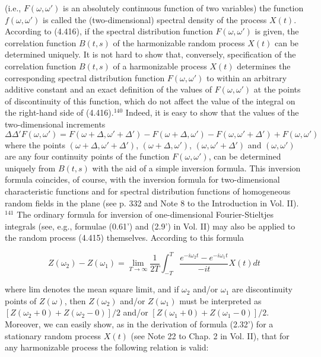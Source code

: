 \documentclass{article}
\begin{document}
(i.e., $F(\omega,\omega')$ is an absolutely continuous function of two variables) the function $f(\omega,\omega')$ is called the (two-dimensional) spectral density of the process $X(t)$. According to (4.416), if the spectral distribution function $F(\omega,\omega')$ is given, the correlation function $B(t,s)$ of the harmonizable random process $X(t)$ can be determined uniquely. It is not hard to show that, conversely, specification of the correlation function $B(t,s)$ of a harmonizable process $X(t)$ determines the corresponding spectral distribution function $F(\omega,\omega')$ to within an arbitrary additive constant and an exact definition of the values of $F(\omega,\omega')$ at the points of discontinuity of this function, which do not affect the value of the integral on the right-hand side of (4.416).$^{140}$ Indeed, it is easy to show that the values of the two-dimensional increments $\Delta\Delta'F(\omega,\omega') = F(\omega+\Delta, \omega'+\Delta') - F(\omega+\Delta, \omega') - F(\omega, \omega'+\Delta') + F(\omega,\omega')$ where the points $(\omega + \Delta, \omega' + \Delta')$, $(\omega + \Delta, \omega')$, $(\omega, \omega' + \Delta')$ and $(\omega,\omega')$ are any four continuity points of the function $F(\omega,\omega')$, can be determined uniquely from $B(t,s)$ with the aid of a simple inversion formula. This inversion formula coincides, of course, with the inversion formula for two-dimensional characteristic functions and for spectral distribution functions of homogeneous random fields in the plane (see p. 332 and Note 8 to the Introduction in Vol. II).$^{141}$ The ordinary formula for inversion of one-dimensional Fourier-Stieltjes integrals (see, e.g., formulae (0.61') and (2.9') in Vol. II) may also be applied to the random process (4.415) themselves. According to this formula

\newpage

\begin{equation}
Z(\omega_2) - Z(\omega_1) = \lim_{T\to\infty} \frac{1}{2T} \int_{-T}^T \frac{e^{-i\omega_2t} - e^{-i\omega_1t}}{-it} X(t)dt
\end{equation}

where lim denotes the mean square limit, and if $\omega_2$ and/or $\omega_1$ are discontinuity points of $Z(\omega)$, then $Z(\omega_2)$ and/or $Z(\omega_1)$ must be interpreted as $[Z(\omega_2 + 0) + Z(\omega_2 - 0)]/2$ and/or $[Z(\omega_1 + 0) + Z(\omega_1 - 0)]/2$. Moreover, we can easily show, as in the derivation of formula (2.32') for a stationary random process $X(t)$ (see Note 22 to Chap. 2 in Vol. II), that for any harmonizable process the following relation is valid:
\end{document}
